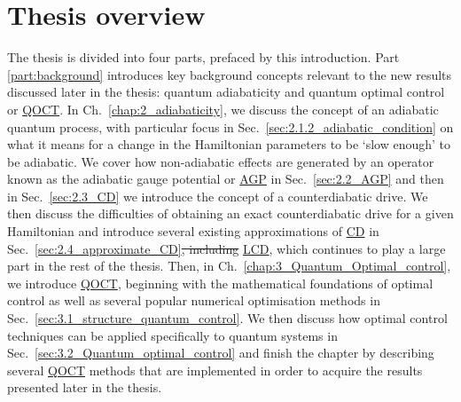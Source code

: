 \documentclass[a4paper,oneside,11pt]{book}
\newcommand{\acrref}[1]{\hyperref[acr:#1]{#1}}
\providecommand{\DIFaddtex}[1]{{\protect\color{blue}\uwave{#1}}} %
\providecommand{\DIFdeltex}[1]{{\protect\color{red}\sout{#1}}}                      %
\providecommand{\DIFaddbegin}{} %
\providecommand{\DIFaddend}{} %
\providecommand{\DIFdelbegin}{} %
\providecommand{\DIFdelend}{} %
\providecommand{\DIFadd}[1]{\texorpdfstring{\DIFaddtex{#1}}{#1}} %
\providecommand{\DIFdel}[1]{\texorpdfstring{\DIFdeltex{#1}}{}} %
\newcommand{\DIFscaledelfig}{0.5}
\newlength{\DIFdelgraphicswidth} %
\newlength{\DIFdelgraphicsheight} %
\newcommand{\DIFaddincludegraphics}[2][]{{\color{blue}\fbox{\DIFOincludegraphics[#1]{#2}}}} %
\newcommand{\DIFdelincludegraphics}[2][]{%
\sbox{\DIFdelgraphicsbox}{\DIFOincludegraphics[#1]{#2}}%
\settoboxwidth{\DIFdelgraphicswidth}{\DIFdelgraphicsbox} %
\settoboxtotalheight{\DIFdelgraphicsheight}{\DIFdelgraphicsbox} %
\scalebox{\DIFscaledelfig}{%
\parbox[b]{\DIFdelgraphicswidth}{\usebox{\DIFdelgraphicsbox}\\[-\baselineskip] \rule{\DIFdelgraphicswidth}{0em}}\llap{\resizebox{\DIFdelgraphicswidth}{\DIFdelgraphicsheight}{%
\setlength{\unitlength}{\DIFdelgraphicswidth}%
\begin{picture}(1,1)%
\thicklines\linethickness{2pt} %
{\color[rgb]{1,0,0}\put(0,0){\framebox(1,1){}}}%
{\color[rgb]{1,0,0}\put(0,0){\line( 1,1){1}}}%
{\color[rgb]{1,0,0}\put(0,1){\line(1,-1){1}}}%
\end{picture}%
}\hspace*{3pt}}} %
} %
\DeclareRobustCommand{\DIFaddbegin}{\DIFOaddbegin \let\includegraphics\DIFaddincludegraphics} %
\DeclareRobustCommand{\DIFaddend}{\DIFOaddend \let\includegraphics\DIFOincludegraphics} %
\DeclareRobustCommand{\DIFdelbegin}{\DIFOdelbegin \let\includegraphics\DIFdelincludegraphics} %
\DeclareRobustCommand{\DIFdelend}{\DIFOaddend \let\includegraphics\DIFOincludegraphics} %
\begin{document}
\section{Thesis overview}

The thesis is divided into four parts, prefaced by this introduction. Part \ref{part:background} introduces key background concepts relevant to the new results discussed later in the thesis: quantum adiabaticity and quantum optimal control or \acrref{QOCT}. In Ch.~\ref{chap:2_adiabaticity}, we discuss the concept of an adiabatic quantum process, with particular focus in Sec.~\ref{sec:2.1.2_adiabatic_condition} on what it means for a change in the Hamiltonian parameters to be `slow enough' to be adiabatic. We cover how non-adiabatic effects are generated by an operator known as the adiabatic gauge potential or \acrref{AGP} in Sec.~\ref{sec:2.2_AGP} and then in Sec.~\ref{sec:2.3_CD} we introduce the concept of a counterdiabatic drive. We then discuss the difficulties of obtaining an exact counterdiabatic drive for a given Hamiltonian and introduce several existing approximations of \acrref{CD} in Sec.~\ref{sec:2.4_approximate_CD}\DIFdelbegin \DIFdel{, including }\DIFdelend \DIFaddbegin \DIFadd{. This includes }\DIFaddend \acrref{LCD}, which continues to play a large part in the rest of the thesis. Then, in Ch.~\ref{chap:3_Quantum_Optimal_control}, we introduce \acrref{QOCT}, beginning with the mathematical foundations of optimal control as well as several popular numerical optimisation methods in Sec.~\ref{sec:3.1_structure_quantum_control}. We then discuss how optimal control techniques can be applied specifically to quantum systems in Sec.~\ref{sec:3.2_Quantum_optimal_control} and finish the chapter by describing several \acrref{QOCT} methods that are implemented in order to acquire the results presented later in the thesis.
\end{document}
